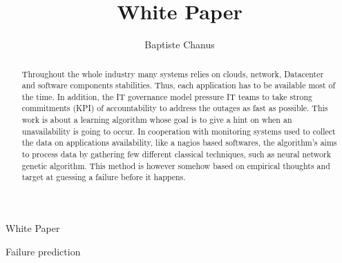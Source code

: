 \documentclass[10pt,a4paper,oneside]{article}
\author{Baptiste Chanus}
\title{White Paper}
\begin{document}
\begin{center}
\begin{Huge}
White Paper
\end{Huge}
\vspace{0.8cm}

\begin{Large}
Failure prediction
\end{Large}
\end{center}

\vspace{0.8cm}

\begin{abstract}
	Throughout the whole industry many systems relies on clouds, network, Datacenter and software components stabilities. Thus, each application has to be available most of the time. In addition, the IT governance model pressure IT teams to take strong commitments (KPI) of accountability to address the outages as fast as possible. This work is about a learning algorithm whose goal is to give a hint on when an unavailability is going to occur. In cooperation with monitoring systems used to collect the data on applications availability, like a nagios based softwares, the algorithm's aims to process data by gathering few different classical techniques, such as neural network genetic algorithm. This method is however somehow based on empirical thoughts and target at guessing a failure before it happens.
\end{abstract}

\vspace{1.2cm}
\end{document}
